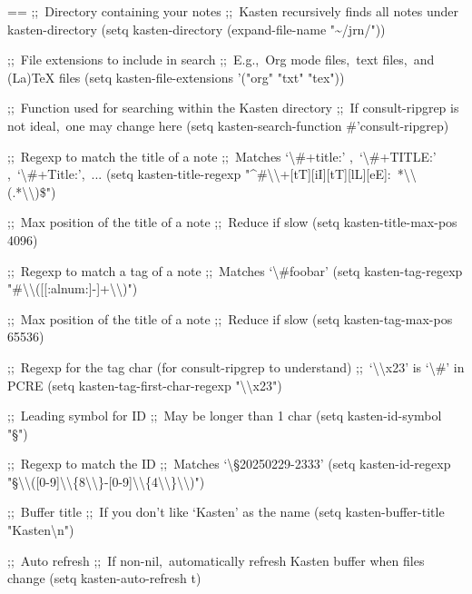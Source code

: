 \documentclass{book}
\makeatletter
\newenvironment{Texinfopreformatted}{%
  \par\GNUTobeylines\obeyspaces\frenchspacing\parskip=\z@\parindent=\z@}{}
{\catcode`\^^M=13 \gdef\GNUTobeylines{\catcode`\^^M=13 \def^^M{\null\par}}}
\newenvironment{Texinfoindented}{\begin{list}{}{}\item\relax}{\end{list}}
\renewcommand{\_}{\Texinfounderscore\discretionary{}{}{}}
\makeatother
\begin{document}
\begin{Texinfoindented}
\begin{Texinfopreformatted}%
\ttfamily ;;\ Directory containing your notes
;;\ Kasten recursively finds all notes under kasten-directory
(setq kasten-directory (expand-file-name "\~{}/jrn/"))

;;\ File extensions to include in search
;;\ E.g.,\ Org mode files,\ text files,\ and (La)TeX files
(setq kasten-file-extensions '("org" "txt" "tex"))

;;\ Function used for searching within the Kasten directory
;;\ If consult-ripgrep is not ideal,\ one may change here
(setq kasten-search-function \#'consult-ripgrep)

;;\ Regexp to match the title of a note
;;\ Matches `\textbackslash{}\#+title:' ,\ `\textbackslash{}\#+TITLE:' ,\ `\textbackslash{}\#+Title:',\ ...
(setq kasten-title-regexp "\^{}\#\textbackslash{}\textbackslash{}+[tT][iI][tT][lL][eE]:\ *\textbackslash{}\textbackslash{}(.*\textbackslash{}\textbackslash{})\$")

;;\ Max position of the title of a note
;;\ Reduce if slow
(setq kasten-title-max-pos 4096)

;;\ Regexp to match a tag of a note
;;\ Matches `\textbackslash{}\#foobar'
(setq kasten-tag-regexp "\#\textbackslash{}\textbackslash{}([[:alnum:]\_-]+\textbackslash{}\textbackslash{})")

;;\ Max position of the title of a note
;;\ Reduce if slow
(setq kasten-tag-max-pos 65536)

;;\ Regexp for the tag char (for consult-ripgrep to understand)
;;\ `\textbackslash{}\textbackslash{}x23' is `\textbackslash{}\#' in PCRE
(setq kasten-tag-first-char-regexp "\textbackslash{}\textbackslash{}x23")

;;\ Leading symbol for ID
;;\ May be longer than 1 char
(setq kasten-id-symbol "§")

;;\ Regexp to match the ID
;;\ Matches `\textbackslash{}§20250229-2333'
(setq kasten-id-regexp "§\textbackslash{}\textbackslash{}([0-9]\textbackslash{}\textbackslash{}\{8\textbackslash{}\textbackslash{}\}-[0-9]\textbackslash{}\textbackslash{}\{4\textbackslash{}\textbackslash{}\}\textbackslash{}\textbackslash{})")

;;\ Buffer title
;;\ If you don't like `Kasten' as the name
(setq kasten-buffer-title "Kasten\textbackslash{}n")

;;\ Auto refresh
;;\ If non-nil,\ automatically refresh Kasten buffer when files change
(setq kasten-auto-refresh t)
\end{Texinfopreformatted}
\end{Texinfoindented}
\end{document}
